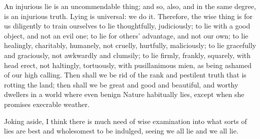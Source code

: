 An injurious lie is an uncommendable thing; and so, also, and in the
same degree, is an injurious truth. Lying is universal: we  do it.
Therefore, the wise thing is for us
diligently to train ourselves to lie thoughtfully, judiciously; to lie
with a good object, and not an evil one; to lie for others' advantage,
and not our own; to lie healingly, charitably, humanely, not cruelly,
hurtfully, maliciously; to lie gracefully and graciously, not awkwardly
and clumsily; to lie firmly, frankly, squarely, with head erect, not
haltingly, tortuously, with pusillanimous mien, as being ashamed of our
high calling. Then shall we be rid of the rank and pestilent truth that
is rotting the land; then shall we be great and good and beautiful, and
worthy dwellers in a world where even benign Nature habitually lies,
except when she promises execrable weather.

Joking aside, I think there is much need of wise examination into what
sorts of lies are best and wholesomest to be indulged, seeing we 
all lie and we  all lie.


\endinput
